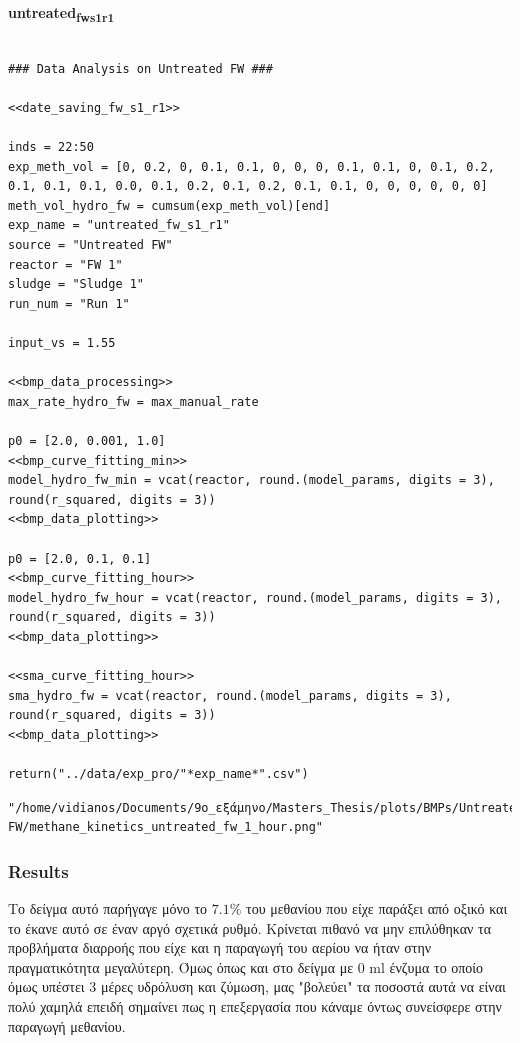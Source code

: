 \documentclass[11pt]{article}
\begin{document}
\textbf{untreated\textsubscript{fw}\textsubscript{s1}\textsubscript{r1}}
\begin{verbatim}

### Data Analysis on Untreated FW ###

<<date_saving_fw_s1_r1>>

inds = 22:50
exp_meth_vol = [0, 0.2, 0, 0.1, 0.1, 0, 0, 0, 0.1, 0.1, 0, 0.1, 0.2, 0.1, 0.1, 0.1, 0.0, 0.1, 0.2, 0.1, 0.2, 0.1, 0.1, 0, 0, 0, 0, 0, 0]
meth_vol_hydro_fw = cumsum(exp_meth_vol)[end]
exp_name = "untreated_fw_s1_r1"
source = "Untreated FW"
reactor = "FW 1"
sludge = "Sludge 1"
run_num = "Run 1"

input_vs = 1.55

<<bmp_data_processing>>
max_rate_hydro_fw = max_manual_rate

p0 = [2.0, 0.001, 1.0]
<<bmp_curve_fitting_min>>
model_hydro_fw_min = vcat(reactor, round.(model_params, digits = 3), round(r_squared, digits = 3))
<<bmp_data_plotting>>

p0 = [2.0, 0.1, 0.1]
<<bmp_curve_fitting_hour>>
model_hydro_fw_hour = vcat(reactor, round.(model_params, digits = 3), round(r_squared, digits = 3))
<<bmp_data_plotting>>

<<sma_curve_fitting_hour>>
sma_hydro_fw = vcat(reactor, round.(model_params, digits = 3), round(r_squared, digits = 3))
<<bmp_data_plotting>>

return("../data/exp_pro/"*exp_name*".csv")
\end{verbatim}

\begin{verbatim}
"/home/vidianos/Documents/9o_εξάμηνο/Masters_Thesis/plots/BMPs/Untreated FW/methane_kinetics_untreated_fw_1_hour.png"
\end{verbatim}

\subsubsection{Results}
\label{sec:orgf05c405}
Το δείγμα αυτό παρήγαγε μόνο το \(7.1 \%\) του μεθανίου που είχε παράξει από οξικό και το έκανε αυτό σε έναν αργό σχετικά ρυθμό. Κρίνεται πιθανό να μην επιλύθηκαν τα προβλήματα διαρροής που είχε και η παραγωγή του αερίου να ήταν στην πραγματικότητα μεγαλύτερη. Όμως όπως και στο δείγμα με 0 ml ένζυμα το οποίο όμως υπέστει 3 μέρες υδρόλυση και ζύμωση, μας "βολεύει" τα ποσοστά αυτά να είναι πολύ χαμηλά επειδή σημαίνει πως η επεξεργασία που κάναμε όντως συνείσφερε στην παραγωγή μεθανίου.
\end{document}
